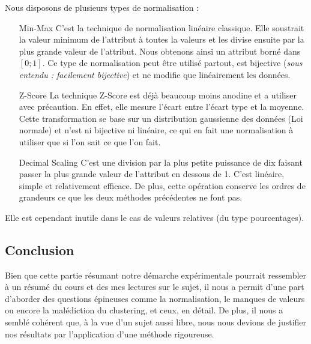 Nous disposons de plusieurs types de normalisation :
\begin{itemize}
	\item [Min-Max] C'est la technique de normalisation linéaire classique. Elle soustrait la valeur minimum de l'attribut à toutes la valeurs et les divise ensuite par la plus grande valeur de l'attribut. Nous obtenons ainsi un attribut borné dans $[0; 1]$. Ce type de normalisation peut être utilisé partout, est bijective (\textsl{sous entendu : facilement bijective}) et ne modifie que linéairement les données.  
	\item [Z-Score] La technique Z-Score est déjà beaucoup moins anodine et a utiliser avec précaution. En effet, elle mesure l'écart entre l'écart type et la moyenne. Cette transformation se base sur un distribution gaussienne des données (\cf Loi normale) et n'est ni bijective ni linéaire, ce qui en fait une normalisation à utiliser que si l'on sait ce que l'on fait.
	\item [Decimal Scaling] C'est une division par la plus petite puissance de dix faisant passer la plus grande valeur de l'attribut en dessous de 1. C'est linéaire, simple et relativement efficace. De plus, cette opération conserve les ordres de grandeurs ce que les deux méthodes précédentes ne font pas.
\end{itemize}

Elle est cependant inutile dans le cas de valeurs relatives (\eg du type pourcentages).

\subsection{Conclusion}
Bien que cette partie résumant notre démarche expérimentale pourrait ressembler à un résumé du cours et des mes lectures sur le sujet, il nous a permit d'une part d'aborder des questions épineuses comme la normalisation, le manques de valeurs ou encore la malédiction du clustering, et ceux, en détail. De plus, il nous a semblé cohérent que, à la vue d'un sujet aussi libre, nous nous devions de justifier nos résultats par l'application d'une méthode rigoureuse.
